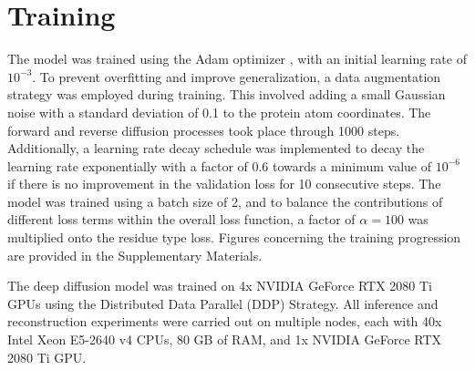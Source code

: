 \section{Training}
The model was trained using the Adam optimizer \cite{kingma2014adam}, with an initial learning rate of $10^{-3}$. To prevent overfitting and improve generalization, a data augmentation strategy was employed during training. This involved adding a small Gaussian noise with a standard deviation of 0.1 to the protein atom coordinates. The forward and reverse diffusion processes took place through 1000 steps. Additionally, a learning rate decay schedule was implemented to decay the learning rate exponentially with a factor of 0.6 towards a minimum value of $10^{-6}$ if there is no improvement in the validation loss for 10 consecutive steps. The model was trained using a batch size of 2, and to balance the contributions of different loss terms within the overall loss function, a factor of $\alpha = 100$ was multiplied onto the residue type loss. Figures concerning the training progression are provided in the Supplementary Materials.

\vspace{3pt} \noindent
The deep diffusion model was trained on 4x NVIDIA GeForce RTX 2080 Ti GPUs using the Distributed Data Parallel (DDP) Strategy. All inference and reconstruction experiments were carried out on multiple nodes, each with 40x Intel Xeon E5-2640 v4 CPUs, 80 GB of RAM, and 1x NVIDIA GeForce RTX 2080 Ti GPU.

